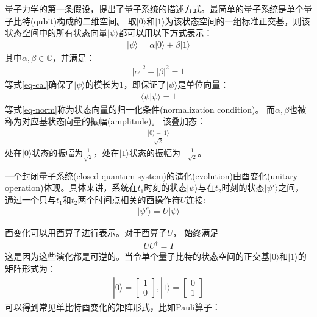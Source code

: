 量子力学的第一条假设，提出了量子系统的描述方式。最简单的量子系统是单个量子比特(qubit)构成的二维空间。
取$|0\rangle$和$|1\rangle$为该状态空间的一组标准正交基，则该状态空间中的所有状态向量$|\psi\rangle$都可以用以下方式表示：
\begin{align}
    |\psi\rangle = \alpha|0\rangle + \beta|1\rangle
\end{align}
其中$\alpha,\beta\in \mathbb{C}$，并满足：
\begin{align}
    |\alpha|^2+|\beta|^2  = 1
    \label{eq-cal}
\end{align}
等式\ref{eq-cal}确保了$|\psi\rangle$的模长为1，即保证了$|\psi\rangle$是单位向量：
\begin{align}
    \langle\psi|\psi\rangle = 1
    \label{eq-norm}
\end{align}
等式\ref{eq-norm}称为状态向量的归一化条件(normalization condition)。
而\(\alpha,\beta\)也被称为对应基状态向量的振幅(amplitude)。
该叠加态：
\begin{align}
    \frac{|0\rangle-|1\rangle}{\sqrt{2}}
\end{align}
处在$|0\rangle$状态的振幅为$\frac{1}{\sqrt{2}}$，处在$|1\rangle$状态的振幅为$-\frac{1}{\sqrt{2}}$。
\begin{theorem}
    一个封闭量子系统(closed quantum system)的演化(evolution)由酉变化(unitary operation)体现。具体来讲，系统在$t_1$时刻的状态$|\psi\rangle$与在$t_2$时刻的状态$|\psi'\rangle$之间，通过一个只与$t_1$和$t_2$两个时间点相关的酉操作符$U$连接:
    \begin{align}
        |\psi'\rangle = U|\psi\rangle
    \end{align}
\end{theorem}
酉变化可以用酉算子进行表示。对于酉算子$U$， 始终满足
\begin{align}
    U U^\dagger = I
\end{align}
这是因为这些演化都是可逆的。当令单个量子比特的状态空间的正交基$|0\rangle$和$|1\rangle$的矩阵形式为：
\begin{align}
    |0\rangle = \left[\begin{matrix}
        1\\0
    \end{matrix}\right],|1\rangle = \left[\begin{matrix}
        0\\1
    \end{matrix}\right]
\end{align}
可以得到常见单比特酉变化的矩阵形式，比如Pauli算子：
